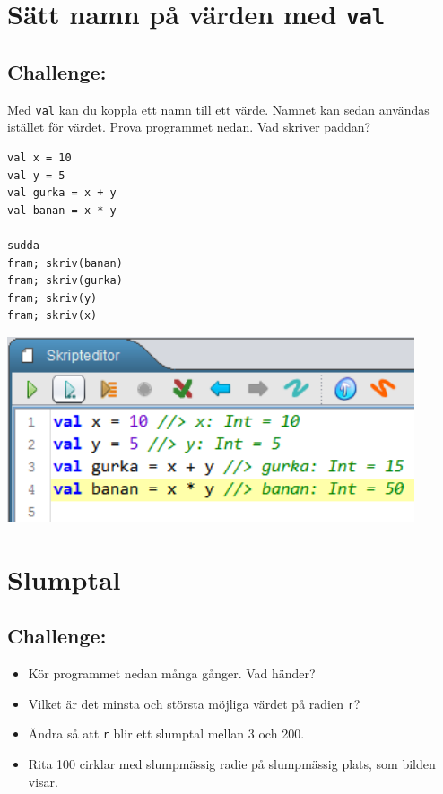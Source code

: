 \chapter{Sätt namn på värden med \lstinline{val}}
\begin{multicols}{2}
\section*{\color{BrickRed}Challenge:}
Med \lstinline{val} kan du koppla ett namn till ett värde. Namnet kan sedan användas istället för värdet. Prova programmet nedan. Vad skriver paddan?

\begin{lstlisting}[numbers=none]
val x = 10
val y = 5
val gurka = x + y
val banan = x * y

sudda
fram; skriv(banan)
fram; skriv(gurka)
fram; skriv(y)
fram; skriv(x)
\end{lstlisting}
        

\columnbreak

\begin{center}
\includegraphics[width=12.0cm]{../img/val.png}
\end{center}

\end{multicols}

\chapter{Slumptal}\section*{\color{BrickRed}Challenge:}


\begin{itemize}

\item {Kör programmet nedan många gånger. Vad händer?}
\item {Vilket är det minsta och största möjliga värdet på radien \lstinline{r}?}
\item {Ändra så att \lstinline{r} blir ett slumptal mellan 3 och 200.}
\item {Rita 100 cirklar med slumpmässig radie på slumpmässig plats, som bilden visar.}

\end{itemize}



